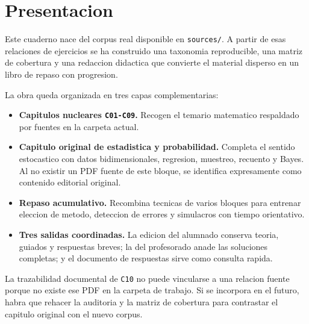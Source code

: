 \chapter*{Presentacion}

Este cuaderno nace del corpus real disponible en \texttt{sources/}. A partir de esas relaciones
de ejercicios se ha construido una taxonomia reproducible, una matriz de cobertura y una
redaccion didactica que convierte el material disperso en un libro de repaso con progresion.

La obra queda organizada en tres capas complementarias:
\begin{itemize}
  \item \textbf{Capitulos nucleares \texttt{C01-C09}.} Recogen el temario matematico respaldado
  por fuentes en la carpeta actual.
  \item \textbf{Capitulo original de estadistica y probabilidad.} Completa el sentido
  estocastico con datos bidimensionales, regresion, muestreo, recuento y Bayes. Al no existir un
  PDF fuente de este bloque, se identifica expresamente como contenido editorial original.
  \item \textbf{Repaso acumulativo.} Recombina tecnicas de varios bloques para entrenar eleccion
  de metodo, deteccion de errores y simulacros con tiempo orientativo.
  \item \textbf{Tres salidas coordinadas.} La edicion del alumnado conserva teoria, guiados y
  respuestas breves; la del profesorado anade las soluciones completas; y el documento de
  respuestas sirve como consulta rapida.
\end{itemize}

La trazabilidad documental de \texttt{C10} no puede vincularse a una relacion fuente porque no
existe ese PDF en la carpeta de trabajo. Si se incorpora en el futuro, habra que rehacer la
auditoria y la matriz de cobertura para contrastar el capitulo original con el nuevo corpus.
